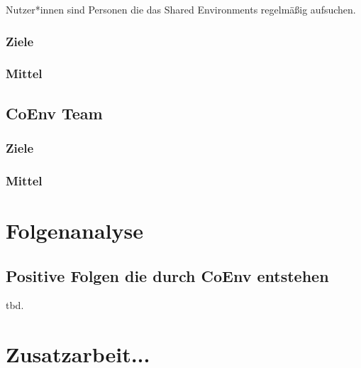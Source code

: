 \documentclass{article}
\begin{document}
Nutzer*innen sind Personen die das Shared Environments regelmäßig aufsuchen.

\subsubsection*{Ziele}
\subsubsection*{Mittel}

\subsection{CoEnv Team}
\subsubsection*{Ziele}
\subsubsection*{Mittel}

\section{Folgenanalyse}

\subsection{Positive Folgen die durch CoEnv entstehen}

tbd.

\section{Zusatzarbeit...}

% 
% 
\end{document}
